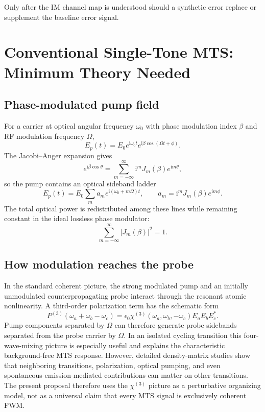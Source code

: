 \documentclass[10pt]{article}
\newcommand{\ii}{\mathrm{i}}
\begin{document}
Only after the IM channel map is understood should a synthetic error replace or supplement the baseline error signal.

\section{Conventional Single-Tone MTS: Minimum Theory Needed}

\subsection{Phase-modulated pump field}
For a carrier at optical angular frequency $\omega_0$ with phase modulation index $\beta$ and RF modulation frequency $\Omega$,
\begin{equation}
E_p(t)=E_0 e^{\ii\omega_0 t}e^{\ii\beta\cos(\Omega t+\phi)}.
\end{equation}
The Jacobi--Anger expansion gives
\begin{equation}
e^{\ii\beta\cos\theta}=\sum_{m=-\infty}^{\infty}\ii^mJ_m(\beta)e^{\ii m\theta},
\end{equation}
so the pump contains an optical sideband ladder
\begin{equation}
E_p(t)=E_0\sum_m a_m e^{\ii(\omega_0+m\Omega)t},\qquad
a_m=\ii^mJ_m(\beta)e^{\ii m\phi}.
\end{equation}
The total optical power is redistributed among these lines while remaining constant in the ideal lossless phase modulator:
\begin{equation}
\sum_{m=-\infty}^{\infty}|J_m(\beta)|^2=1.
\end{equation}

\subsection{How modulation reaches the probe}
In the standard coherent picture, the strong modulated pump and an initially unmodulated counterpropagating probe interact through the resonant atomic nonlinearity. A third-order polarization term has the schematic form
\begin{equation}
P^{(3)}(\omega_a+\omega_b-\omega_c)
=\epsilon_0\chi^{(3)}(\omega_a,\omega_b,-\omega_c)E_aE_bE_c^*.
\end{equation}
Pump components separated by $\Omega$ can therefore generate probe sidebands separated from the probe carrier by $\Omega$. In an isolated cycling transition this four-wave-mixing picture is especially useful and explains the characteristic background-free MTS response. However, detailed density-matrix studies show that neighboring transitions, polarization, optical pumping, and even spontaneous-emission-mediated contributions can matter on other transitions. The present proposal therefore uses the $\chi^{(3)}$ picture as a perturbative organizing model, not as a universal claim that every MTS signal is exclusively coherent FWM.
\end{document}
